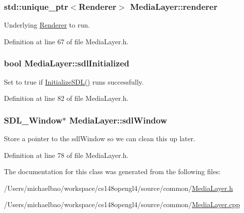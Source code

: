 \subsubsection[{renderer}]{\setlength{\rightskip}{0pt plus 5cm}std\+::unique\+\_\+ptr$<${\bf Renderer}$>$ Media\+Layer\+::renderer\hspace{0.3cm}{\ttfamily [private]}}\label{class_media_layer_aee28804a7f4e1fb771b11e93b218e387}


Underlying \hyperlink{class_renderer}{Renderer} to run. 



Definition at line 67 of file Media\+Layer.\+h.

\hypertarget{class_media_layer_ab577253a72d7d158badb3932f09e7d3f}{}
\subsubsection[{sdl\+Initialized}]{\setlength{\rightskip}{0pt plus 5cm}bool Media\+Layer\+::sdl\+Initialized\hspace{0.3cm}{\ttfamily [private]}}\label{class_media_layer_ab577253a72d7d158badb3932f09e7d3f}


Set to true if \hyperlink{class_media_layer_ad72130dbe963e351d5749a7f48b4ef97}{Initialize\+S\+D\+L()} runs successfully. 



Definition at line 82 of file Media\+Layer.\+h.

\hypertarget{class_media_layer_a769679df4457ecbe60e9668199e8788b}{}
\subsubsection[{sdl\+Window}]{\setlength{\rightskip}{0pt plus 5cm}S\+D\+L\+\_\+\+Window$\ast$ Media\+Layer\+::sdl\+Window\hspace{0.3cm}{\ttfamily [private]}}\label{class_media_layer_a769679df4457ecbe60e9668199e8788b}


Store a pointer to the sdl\+Window so we can clean this up later. 



Definition at line 78 of file Media\+Layer.\+h.



The documentation for this class was generated from the following files\+:\begin{DoxyCompactItemize}
\item 
/\+Users/michaelbao/workspace/cs148opengl4/source/common/\hyperlink{_media_layer_8h}{Media\+Layer.\+h}\item 
/\+Users/michaelbao/workspace/cs148opengl4/source/common/\hyperlink{_media_layer_8cpp}{Media\+Layer.\+cpp}\end{DoxyCompactItemize}
